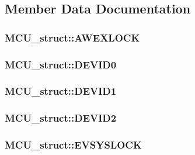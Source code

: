 \subsection{Member Data Documentation}
\hypertarget{struct_m_c_u__struct_a25043851a658a15513404de60e29ab24}{
\subsubsection[{AWEXLOCK}]{ {\bf MCU\_\-struct::AWEXLOCK}}}
\label{struct_m_c_u__struct_a25043851a658a15513404de60e29ab24}
\hypertarget{struct_m_c_u__struct_ab8d62789898e31f6356ee2f797ffc18e}{
\subsubsection[{DEVID0}]{ {\bf MCU\_\-struct::DEVID0}}}
\label{struct_m_c_u__struct_ab8d62789898e31f6356ee2f797ffc18e}
\hypertarget{struct_m_c_u__struct_a1b901c61c8910324709fd7ce29d4dc8c}{
\subsubsection[{DEVID1}]{ {\bf MCU\_\-struct::DEVID1}}}
\label{struct_m_c_u__struct_a1b901c61c8910324709fd7ce29d4dc8c}
\hypertarget{struct_m_c_u__struct_a0d7e65f42906cfdce10cd1dfb3f0e89e}{
\subsubsection[{DEVID2}]{ {\bf MCU\_\-struct::DEVID2}}}
\label{struct_m_c_u__struct_a0d7e65f42906cfdce10cd1dfb3f0e89e}
\hypertarget{struct_m_c_u__struct_addef5ef11df1d8e4ea3b4bd65f0809c1}{
\subsubsection[{EVSYSLOCK}]{ {\bf MCU\_\-struct::EVSYSLOCK}}}
